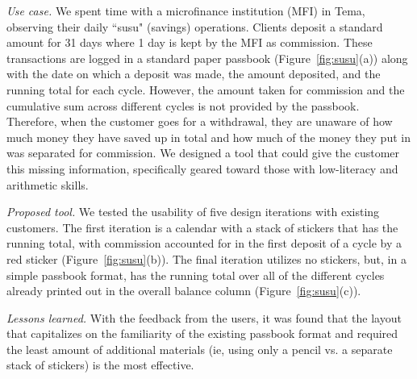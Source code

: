 \documentclass{sig-alternate}
\begin{document}
\emph{Use case.}
We spent time with a microfinance institution (MFI) in Tema, observing their daily ``susu" (savings) operations. Clients deposit a standard amount for 31 days where 1 day is kept by the MFI as commission. These transactions are logged in a standard paper passbook (Figure~\ref{fig:susu}(a)) along with the date on which a deposit was made, the amount deposited, and the running total for each cycle. However, the amount taken for commission and the cumulative sum across different cycles is not provided by the passbook. Therefore, when the customer goes for a withdrawal, they are unaware of how much money they have saved up in total and how much of the money they put in was separated for commission. We designed a tool that could give the customer this missing information, specifically geared toward those with low-literacy and arithmetic skills.

\emph{Proposed tool.}
We tested the usability of five design iterations with existing customers. 
The first iteration is a calendar with a stack of stickers that has the running total, with commission accounted for in the first deposit of a cycle by a red sticker (Figure~\ref{fig:susu}(b)). The final iteration utilizes no stickers, but, in a simple passbook format, has the running total over all of the different cycles already printed out in the overall balance column (Figure~\ref{fig:susu}(c)). 

\emph{Lessons learned.}
With the feedback from the users, it was found that the layout that capitalizes on the familiarity of the existing passbook format and required the least amount of additional materials (ie, using only a pencil vs. a separate stack of stickers) is the most effective.
\end{document}
